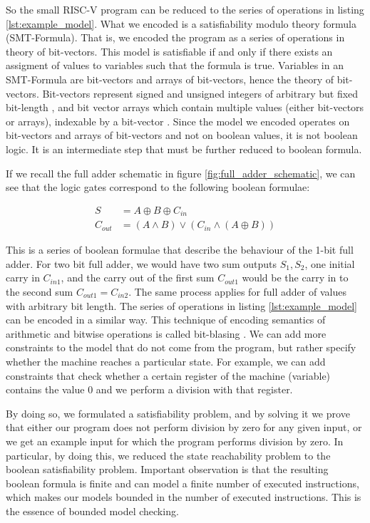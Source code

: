 \documentclass[12pt]{article}
\begin{document}
So the small RISC-V program can be reduced to the series of operations in
listing \ref{lst:example_model}. What we encoded is a satisfiability modulo
theory formula (SMT-Formula). That is, we encoded the program as a series of
operations in theory of bit-vectors. This model is satisfiable if and only if
there exists an assigment of values to variables such that the formula is true.
Variables in an SMT-Formula are bit-vectors and arrays of bit-vectors, hence
the theory of bit-vectors. Bit-vectors represent signed and unsigned integers
of arbitrary but fixed bit-length \cite{de2009satisfiability}, and bit vector
arrays which contain multiple values (either bit-vectors or arrays), indexable
by a bit-vector \cite{btor2}. Since the model we encoded operates on
bit-vectors and arrays of bit-vectors and not on boolean values, it is not
boolean logic. It is an intermediate step that must be further reduced to
boolean formula.

If we recall the full adder schematic in figure \ref{fig:full_adder_schematic},
we can see that the logic gates correspond to the following boolean formulae:

\begin{align*}
    S	    &= A \oplus B \oplus C_{in} \\
    C_{out} &= (A \land B) \lor (C_{in} \land (A \oplus B))
\end{align*}

This is a series of boolean formulae that describe the behaviour of the 1-bit
full adder. For two bit full adder, we would have two sum outputs $S_1, S_2$,
one initial carry in $C_{in1}$, and the carry out of the first sum $C_{out1}$
would be the carry in to the second sum $C_{out1} = C_{in2}$. The same process
applies for full adder of values with arbitrary bit length. The series of
operations in listing \ref{lst:example_model} can be encoded in a similar
way. This technique of encoding semantics of arithmetic and bitwise operations
is called bit-blasing \cite{barrett2021satisfiability}. We can add more
constraints to the model that do not come from the program, but rather specify
whether the machine reaches a particular state. For example, we can add
constraints that check whether a certain register of the machine (variable)
contains the value $0$ and we perform a division with that register. 

By doing so, we formulated a satisfiability problem, and by solving it we prove
that either our program does not perform division by zero for any given input,
or we get an example input for which the program performs division by zero. In
particular, by doing this, we reduced the state reachability problem to the
boolean satisfiability problem. Important observation is that the resulting 
boolean formula is finite and can model a finite number of executed
instructions, which makes our models bounded in the number of executed
instructions. This is the essence of bounded model checking.
\end{document}
